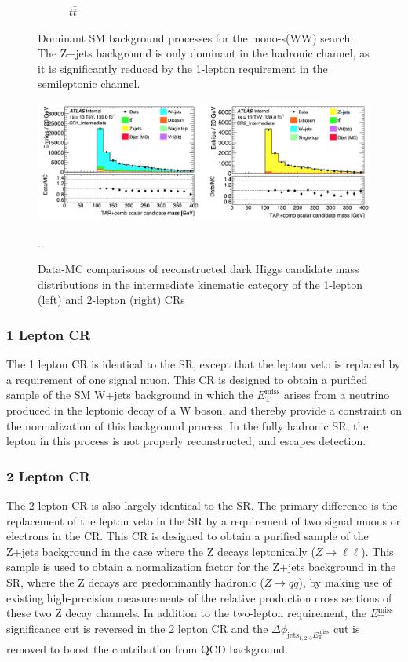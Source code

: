 \documentclass[12pt]{article}
\newcommand*{\met}{\ensuremath{E_\text{T}^\text{miss}} }
\newcommand*{\mindphi}{\ensuremath{\Delta \phi_{\text{jets}_{1,2,3} \met}} }
\begin{document}
\begin{figure}[H]
\begin{subfigure}[b]{0.4\textwidth}
         \caption[]{$t\bar{t}$}
         \label{fig:ttbar}
     \end{subfigure}
\caption[]{Dominant SM background processes for the mono-s(WW) search. The Z+jets background is only dominant in the hadronic channel, as it is significantly reduced by the 1-lepton requirement in the semileptonic channel.}
\label{fig:dom_bkgs}
\end{figure}

\begin{figure}[H]
	\centering
	\includegraphics[width=\textwidth]{figures/had_Intermediate_DataMC.png}
	\caption[]{Data-MC comparisons of reconstructed dark Higgs candidate mass distributions in the intermediate kinematic category of the 1-lepton (left) and 2-lepton (right) CRs}.
	\label{fig:had_Intermediate_DataMC} 
\end{figure}

\subsubsection{1 Lepton CR}

The 1 lepton CR is identical to the SR, except that the lepton veto is replaced by a requirement of one signal muon. This CR is designed to obtain a purified sample of the SM W+jets background in which the \met arises from a neutrino produced in the leptonic decay of a W boson, and thereby provide a constraint on the normalization of this background process. In the fully hadronic SR, the lepton in this process is not properly reconstructed, and escapes detection. 

\subsubsection{2 Lepton CR}

The 2 lepton CR is also largely identical to the SR. The primary difference is the replacement of the lepton veto in the SR by a requirement of two signal muons or electrons in the CR. This CR is designed to obtain a purified sample of the Z+jets background in the case where the Z decays leptonically ($Z\rightarrow\ell\ell$). This sample is used to obtain a normalization factor for the Z+jets background in the SR, where the Z decays are predominantly hadronic ($Z\rightarrow qq$), by making use of existing high-precision measurements of the relative production cross sections of these two Z decay channels. In addition to the two-lepton requirement, the \met significance cut is reversed in the 2 lepton CR and the \mindphi cut is removed to boost the contribution from QCD background. 
\end{document}
